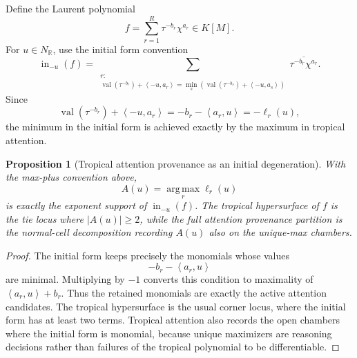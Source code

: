 \documentclass[11pt]{article}
\theoremstyle{definition}
\theoremstyle{plain}
\newtheorem{proposition}[definition]{Proposition}
\theoremstyle{remark}
\numberwithin{equation}{section}
\newcommand{\R}{\mathbb{R}}
\newcommand{\argmax}{\operatorname*{arg\,max}}
\newcommand{\abs}[1]{\left\lvert #1\right\rvert}
\newcommand{\ip}[2]{\left\langle #1,#2\right\rangle}
\begin{document}
Define the Laurent polynomial
\begin{equation}
  f=\sum_{r=1}^R \tau^{-b_r}\chi^{a_r}\in K[M].
\end{equation}
For $u\in N_\R$, use the initial form convention
\begin{equation}
  \operatorname{in}_{-u}(f)
  =
  \sum_{\substack{r:\\
    \operatorname{val}(\tau^{-b_r})+\ip{-u}{a_r}
    =\min_s(\operatorname{val}(\tau^{-b_s})+\ip{-u}{a_s})}}
    \overline{\tau^{-b_r}\chi^{a_r}}.
\end{equation}
Since
\begin{equation}
  \operatorname{val}(\tau^{-b_r})+\ip{-u}{a_r}
  =
  -b_r-\ip{a_r}{u}
  =
  -\ell_r(u),
\end{equation}
the minimum in the initial form is achieved exactly by the maximum in tropical attention.

\begin{proposition}[Tropical attention provenance as an initial degeneration]\label{prop:attention-initial-degeneration}
With the max-plus convention above,
\begin{equation}
  A(u)=\argmax_r \ell_r(u)
\end{equation}
is exactly the exponent support of $\operatorname{in}_{-u}(f)$.  The tropical hypersurface of $f$ is the tie locus where $\abs{A(u)}\ge2$, while the full attention provenance partition is the normal-cell decomposition recording $A(u)$ also on the unique-max chambers.
\end{proposition}

\begin{proof}
The initial form keeps precisely the monomials whose values
\begin{equation}
  -b_r-\ip{a_r}{u}
\end{equation}
are minimal.  Multiplying by $-1$ converts this condition to maximality of $\ip{a_r}{u}+b_r$.  Thus the retained monomials are exactly the active attention candidates.  The tropical hypersurface is the usual corner locus, where the initial form has at least two terms.  Tropical attention also records the open chambers where the initial form is monomial, because unique maximizers are reasoning decisions rather than failures of the tropical polynomial to be differentiable.
\end{proof}
\end{document}
